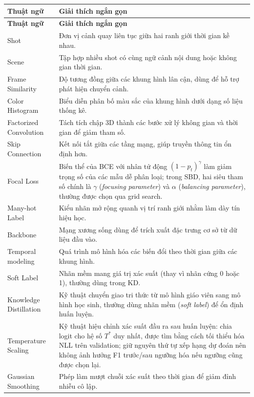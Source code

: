 {
\small
\renewcommand{\arraystretch}{1.2}
\begin{longtable}{L{4.2cm}L{8.8cm}}
\toprule
\textbf{Thuật ngữ} & \textbf{Giải thích ngắn gọn} \\
\midrule
\endfirsthead
\toprule
\textbf{Thuật ngữ} & \textbf{Giải thích ngắn gọn} \\
\midrule
\endhead
Shot & Đơn vị cảnh quay liên tục giữa hai ranh giới thời gian kề nhau. \\
Scene & Tập hợp nhiều shot có cùng ngữ cảnh nội dung hoặc không gian thời gian. \\
Frame Similarity & Độ tương đồng giữa các khung hình lân cận, dùng để hỗ trợ phát hiện chuyển cảnh. \\
Color Histogram & Biểu diễn phân bố màu sắc của khung hình dưới dạng số liệu thống kê. \\
Factorized Convolution & Tách tích chập 3D thành các bước xử lý không gian và thời gian để giảm tham số. \\
Skip Connection & Kết nối tắt giữa các tầng mạng, giúp truyền thông tin ổn định hơn. \\
Focal Loss & Biến thể của BCE với nhân tử động $(1-p_t)^{\gamma}$ làm giảm trọng số của các mẫu dễ phân loại; trong SBD, hai siêu tham số chính là $\gamma$ (\textit{focusing parameter}) và $\alpha$ (\textit{balancing parameter}), thường được chọn qua grid search. \\
Many-hot Label & Kiểu nhãn mở rộng quanh vị trí ranh giới nhằm làm dày tín hiệu học. \\
Backbone & Mạng xương sống dùng để trích xuất đặc trưng cơ sở từ dữ liệu đầu vào. \\
Temporal modeling & Quá trình mô hình hóa các biến đổi theo thời gian giữa các khung hình. \\
Soft Label & Nhãn mềm mang giá trị xác suất (thay vì nhãn cứng 0 hoặc 1), thường dùng trong KD. \\
Knowledge Distillation & Kỹ thuật chuyển giao tri thức từ mô hình giáo viên sang mô hình học sinh, thường dùng nhãn mềm (\textit{soft label}) để ổn định huấn luyện. \\
Temperature Scaling & Kỹ thuật hiệu chỉnh xác suất đầu ra sau huấn luyện: chia logit cho hệ số $T^*$ duy nhất, được tìm bằng cách tối thiểu hóa NLL trên validation; giữ nguyên thứ tự xếp hạng dự đoán nên không ảnh hưởng F1 trước/sau ngưỡng hóa nếu ngưỡng cũng được chọn lại. \\
Gaussian Smoothing & Phép làm mượt chuỗi xác suất theo thời gian để giảm đỉnh nhiễu cô lập. \\

\end{longtable}}
